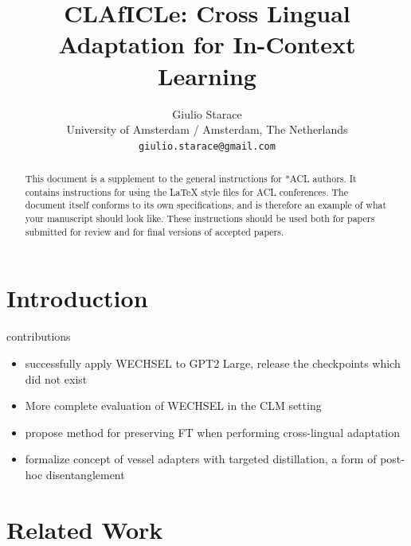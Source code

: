 \documentclass[11pt]{article}
\title{CLAfICLe: Cross Lingual Adaptation for In-Context Learning}
\author{Giulio Starace \\
  University of Amsterdam / Amsterdam, The Netherlands \\
  \texttt{giulio.starace@gmail.com} \\}
\begin{document}
\maketitle
\begin{abstract}
	This document is a supplement to the general instructions for *ACL authors. It contains instructions for using the \LaTeX{} style files for ACL conferences.
	The document itself conforms to its own specifications, and is therefore an example of what your manuscript should look like.
	These instructions should be used both for papers submitted for review and for final versions of accepted papers.
\end{abstract}

\section{Introduction}

contributions
\begin{itemize}
	\item successfully apply WECHSEL to GPT2 Large, release the checkpoints which did not exist
	\item More complete evaluation of WECHSEL in the CLM setting
	\item propose method for preserving FT when performing cross-lingual adaptation
	\item formalize concept of vessel adapters with targeted distillation, a form of post-hoc disentanglement
\end{itemize}

\section{Related Work}
\end{document}

